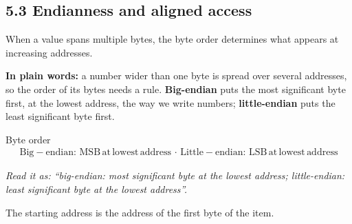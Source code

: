 \documentclass[11pt]{article}
\begin{document}
\begin{keepsection}
\section{5.3 Endianness and aligned access}

When a value spans multiple bytes, the byte order determines what appears at increasing addresses.

\begin{plainbox}\textbf{In plain words:} a number wider than one byte is spread over several addresses, so the order of its bytes needs a rule. \textbf{Big-endian} puts the most significant byte first, at the lowest address, the way we write numbers; \textbf{little-endian} puts the least significant byte first.\end{plainbox}

\begin{equationcard}{Byte order}
\[ \begin{gathered} \text{Big}-\text{endian}:\, \text{MSB}\, \text{at}\, \text{lowest}\, \text{address}\, \cdot \, \text{Little}-\text{endian}:\, \text{LSB}\, \text{at}\, \text{lowest}\, \text{address} \end{gathered} \]
{\small \emph{Read it as: “big-endian: most significant byte at the lowest address; little-endian: least significant byte at the lowest address”.}\par The starting address is the address of the first byte of the item.}
\end{equationcard}


\end{keepsection}
\end{document}
